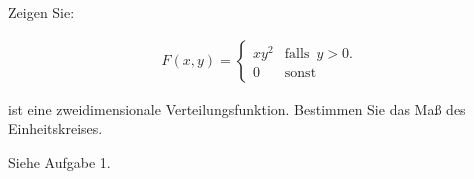 
\begin{exercise}

Zeigen Sie:

\begin{align*}
  F(x, y) =
  \begin{cases}
    x y^2 & \text{falls} \enspace y > 0. \\
    0     & \text{sonst}
  \end{cases}
\end{align*}

ist eine zweidimensionale Verteilungsfunktion. Bestimmen Sie das Maß des Einheitskreises.

\end{exercise}


\begin{solution}

Siehe Aufgabe 1.

\end{solution}

